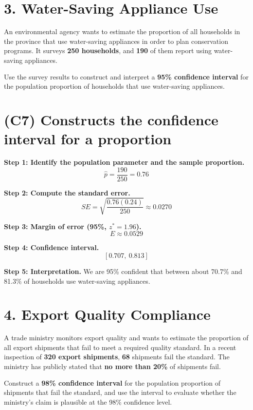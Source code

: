 \section*{3. Water-Saving Appliance Use}

An environmental agency wants to estimate the proportion of all households in the province that use water-saving appliances in order to plan conservation programs. It surveys \textbf{250 households}, and \textbf{190} of them report using water-saving appliances.

Use the survey results to construct and interpret a \textbf{95\% confidence interval} for the population proportion of households that use water-saving appliances.
	
	\section{(C7) Constructs the confidence interval for a proportion}
	
	\textbf{Step 1: Identify the population parameter and the sample proportion.}
	\[
	\hat{p} = \frac{190}{250} = 0.76
	\]
	
	\textbf{Step 2: Compute the standard error.}
	\[
	SE = \sqrt{\frac{0.76(0.24)}{250}} \approx 0.0270
	\]
	
	\textbf{Step 3: Margin of error (95\%, \(z^* = 1.96\)).}
	\[
	E \approx 0.0529
	\]
	
	\textbf{Step 4: Confidence interval.}
	\[
	[0.707,\ 0.813]
	\]
	
	\textbf{Step 5: Interpretation.}
	We are 95\% confident that between about 70.7\% and 81.3\% of households use water-saving appliances.
	
\section*{4. Export Quality Compliance}

A trade ministry monitors export quality and wants to estimate the proportion of all export shipments that fail to meet a required quality standard. In a recent inspection of \textbf{320 export shipments}, \textbf{68} shipments fail the standard. The ministry has publicly stated that \textbf{no more than 20\%} of shipments fail.

Construct a \textbf{98\% confidence interval} for the population proportion of shipments that fail the standard, and use the interval to evaluate whether the ministry’s claim is plausible at the 98\% confidence level.
	
